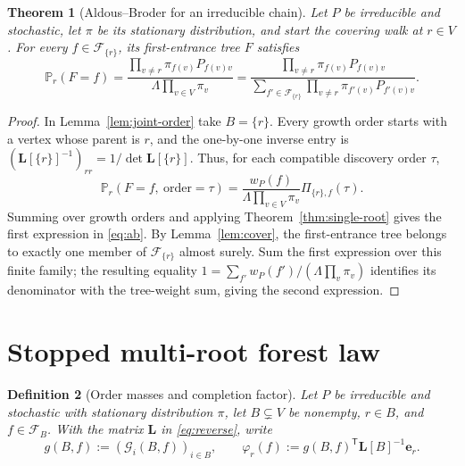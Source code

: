\documentclass[11pt]{article}
\newtheorem{definition}{Definition}[section]
\newtheorem{theorem}[definition]{Theorem}
\newcommand{\Lmat}{\mathbf L}
\begin{document}
\begin{theorem}[Aldous--Broder for an irreducible chain]
\label{thm:ab}
Let $P$ be irreducible and stochastic, let $\pi$ be its stationary
distribution, and start the covering walk at $r\in V$.
For every $f\in\mathcal F_{\{r\}}$, its first-entrance tree $F$
satisfies
\begin{equation}\label{eq:ab}
\mathbb P_r(F=f)
=\frac{\displaystyle\prod_{v\neq r}\pi_{f(v)}P_{f(v)v}}
 {\displaystyle\Lambda\prod_{v\in V}\pi_v}
=\frac{\displaystyle\prod_{v\neq r}\pi_{f(v)}P_{f(v)v}}
 {\displaystyle\sum_{f'\in\mathcal F_{\{r\}}}
   \prod_{v\neq r}\pi_{f'(v)}P_{f'(v)v}}.
\end{equation}
\end{theorem}
\begin{proof}
In Lemma~\ref{lem:joint-order} take $B=\{r\}$.
Every growth order starts with a vertex whose parent is $r$,
and the one-by-one inverse entry is
$(\Lmat[\{r\}]^{-1})_{rr}=1/\det\Lmat[\{r\}]$.
Thus, for each compatible discovery order $\tau$,
\[
\mathbb P_r(F=f,\ \text{order}=\tau)
=\frac{w_P(f)}{\Lambda\prod_{v\in V}\pi_v}
  \Pi_{\{r\},f}(\tau).
\]
Summing over growth orders and applying
Theorem~\ref{thm:single-root} gives the first expression in
\eqref{eq:ab}. By Lemma~\ref{lem:cover}, the first-entrance
tree belongs to exactly one member of $\mathcal F_{\{r\}}$
almost surely. Sum the first expression over this finite family;
the resulting equality $1=\sum_{f'}w_P(f')/
(\Lambda\prod_v\pi_v)$ identifies its denominator with the
tree-weight sum, giving the second expression.
\end{proof}

\section{Stopped multi-root forest law}

\begin{definition}[Order masses and completion factor]
\label{def:completion}
Let $P$ be irreducible and stochastic with stationary
distribution $\pi$, let $B\subsetneq V$ be nonempty, $r\in B$, and
$f\in\mathcal F_B$. With the matrix $\Lmat$ in
\eqref{eq:reverse}, write
\[
g(B,f):=(\mathcal G_i(B,f))_{i\in B},\qquad
\varphi_r(f):=g(B,f)^{\mathsf T}\Lmat[B]^{-1}\mathbf e_r.
\]
\end{definition}
\end{document}
